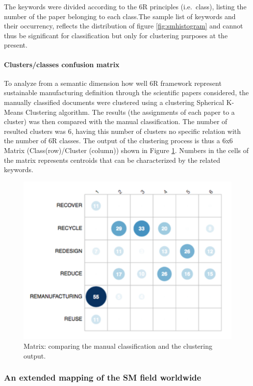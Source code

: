 \documentclass[]{book}
\let\oldparagraph\paragraph
\renewcommand{\paragraph}[1]{\oldparagraph{#1}\mbox{}}
\begin{document}
The keywords were divided according to the 6R principles (i.e.~class),
listing the number of the paper belonging to each class.The sample list
of keywords and their occurrency, reflects the distribution of figure
\ref{fig:smhistogram} and cannot thus be significant for classification
but only for clustering purposes at the present.

\paragraph{Clusters/classes confusion
matrix}\label{clustersclasses-confusion-matrix}

To analyze from a semantic dimension how well 6R framework represent
sustainable manufacturing definition through the scientific papers
considered, the manually classified documents were clustered using a
clustering Spherical K-Means Clustering algorithm. The results (the
assignments of each paper to a cluster) was then compared with the
manual classification. The number of resulted clusters was 6, having
this number of clusters no specific relation with the number of 6R
classes. The output of the clustering process is thus a 6x6 Matrix
(Class(row)/Cluster (column)) shown in Figure \ref{fig:clusterssm}.
Numbers in the cells of the matrix represents centroids that can be
characterized by the related keywords.

\begin{figure}

{\centering \includegraphics[width=0.6\linewidth]{_bookdown_files/figures/heat_map_sm} 

}

\caption{Matrix: comparing the manual classification and the clustering output.}\label{fig:clusterssm}
\end{figure}

\subsubsection{An extended mapping of the SM field
worldwide}\label{an-extended-mapping-of-the-sm-field-worldwide}
\end{document}
